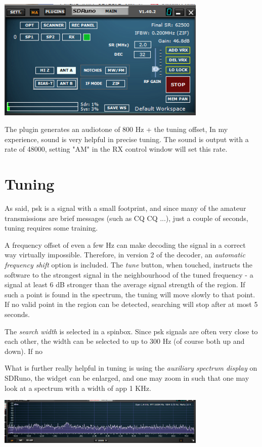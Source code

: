 \documentclass[11pt]{article}
\begin{document}
\includegraphics[width=100mm]{main-widget.png}

The plugin generates an audiotone of 800 Hz + the tuning offset,
In my experience, sound is very helpful in precise tuning.
The sound is output with a rate of 48000, setting "AM" in the RX control window
will set this rate.

\section{Tuning}
As said, psk is a signal with a small footprint, and since many of
the amateur transmissions are brief messages (such as CQ CQ ...),
just a couple of seconds, tuning requires some training.
\par
A frequency offset of even a few Hz can make decoding the signal in a
correct way virtually impossible.
Therefore, in version 2 of the decoder, an
{\em automatic frequency shift} option is included.
The {\em tune} button, when touched, instructs the software to
the strongest signal in the
neighbourhood of the tuned frequency - a signal at least 6 dB stronger
than the average signal strength of the region.
If such a point is found in the spectrum, the tuning will move slowly to
that point.
If no valid point in the region can be detected, searching will stop
after at most 5 seconds.
\par
The {\em search width} is selected in a spinbox. Since psk signals
are often very close to each other, the width can be selected to up to
300 Hz (of course both up and down).
If no 
\par
What is further really helpful  in tuning is using
 the {\em auxiliary spectrum display} on 
SDRuno, the widget can be enlarged, and one may zoom in such
that one may look at a spectrum with a width of app 1 KHz.

\includegraphics[width=100mm]{auxiliary-spectrum-display.png}
\end{document}
